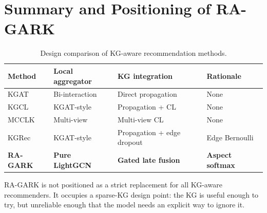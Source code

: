 \section{Summary and Positioning of RA-GARK}
\label{sec:rw-summary}

\begin{table}[!htbp]
\centering
\caption{Design comparison of KG-aware recommendation methods.}
\label{tab:rw-summary}
\begin{tabular}{l l l l}
\toprule
Method & Local aggregator & KG integration & Rationale \\
\midrule
KGAT       & Bi-interaction  & Direct propagation         & None \\
KGCL       & KGAT-style      & Propagation + CL           & None \\
MCCLK      & Multi-view      & Multi-view CL              & None \\
KGRec      & KGAT-style      & Propagation + edge dropout & Edge Bernoulli \\
\midrule
\textbf{RA-GARK} & \textbf{Pure LightGCN} & \textbf{Gated late fusion} & \textbf{Aspect softmax} \\
\bottomrule
\end{tabular}
\end{table}
\FloatBarrier

RA-GARK is not positioned as a strict replacement for all KG-aware recommenders. It occupies a sparse-KG design point: the KG is useful enough to try, but unreliable enough that the model needs an explicit way to ignore it.
